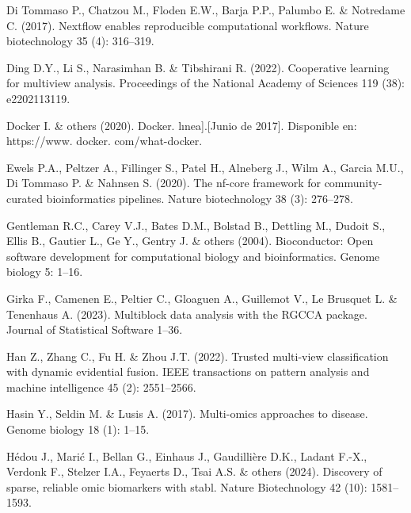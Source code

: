 \documentclass[
]{article}
\newlength{\cslhangindent}
\newlength{\cslentryspacingunit} %
\newenvironment{CSLReferences}[2] %
 {%
  \setlength{\parindent}{0pt}
  \ifodd #1
  \let\oldpar\par
  \def\par{\hangindent=\cslhangindent\oldpar}
  \fi
  \setlength{\parskip}{#2\cslentryspacingunit}
 }%
 {}
\begin{document}
\begin{CSLReferences}{1}{0}
\leavevmode{}%
Di Tommaso P., Chatzou M., Floden E.W., Barja P.P., Palumbo E. \& Notredame C. (2017). Nextflow enables reproducible computational workflows. Nature biotechnology 35 (4): 316--319.

\leavevmode{}%
Ding D.Y., Li S., Narasimhan B. \& Tibshirani R. (2022). Cooperative learning for multiview analysis. Proceedings of the National Academy of Sciences 119 (38): e2202113119.

\leavevmode{}%
Docker I. \& others (2020). Docker. l{ı}nea{]}.{[}Junio de 2017{]}. Disponible en: https://www. docker. com/what-docker.

\leavevmode{}%
Ewels P.A., Peltzer A., Fillinger S., Patel H., Alneberg J., Wilm A., Garcia M.U., Di Tommaso P. \& Nahnsen S. (2020). The nf-core framework for community-curated bioinformatics pipelines. Nature biotechnology 38 (3): 276--278.

\leavevmode{}%
Gentleman R.C., Carey V.J., Bates D.M., Bolstad B., Dettling M., Dudoit S., Ellis B., Gautier L., Ge Y., Gentry J. \& others (2004). Bioconductor: Open software development for computational biology and bioinformatics. Genome biology 5: 1--16.

\leavevmode{}%
Girka F., Camenen E., Peltier C., Gloaguen A., Guillemot V., Le Brusquet L. \& Tenenhaus A. (2023). Multiblock data analysis with the RGCCA package. Journal of Statistical Software 1--36.

\leavevmode{}%
Han Z., Zhang C., Fu H. \& Zhou J.T. (2022). Trusted multi-view classification with dynamic evidential fusion. IEEE transactions on pattern analysis and machine intelligence 45 (2): 2551--2566.

\leavevmode{}%
Hasin Y., Seldin M. \& Lusis A. (2017). Multi-omics approaches to disease. Genome biology 18 (1): 1--15.

\leavevmode{}%
Hédou J., Marić I., Bellan G., Einhaus J., Gaudillière D.K., Ladant F.-X., Verdonk F., Stelzer I.A., Feyaerts D., Tsai A.S. \& others (2024). Discovery of sparse, reliable omic biomarkers with stabl. Nature Biotechnology 42 (10): 1581--1593.


\end{CSLReferences}
\end{document}
